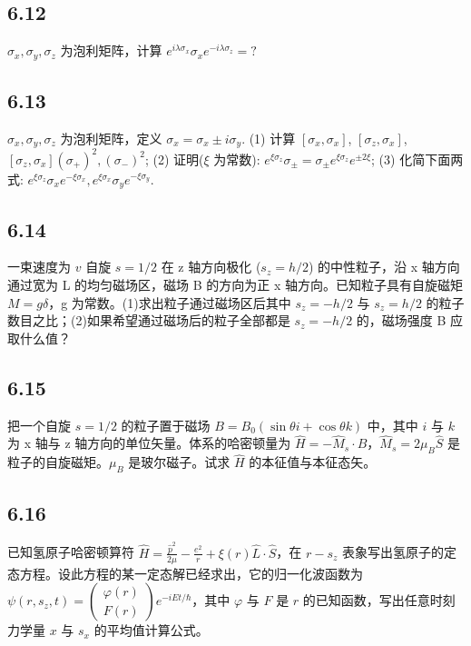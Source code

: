 \subsection{6.12}
$\sigma_x, \sigma_y, \sigma_z$ 为泡利矩阵，计算 $ e^{i\lambda \sigma_x} \sigma_x e^{-i\lambda \sigma_z} = ?$

\subsection{6.13}
$\sigma_x, \sigma_y, \sigma_z$ 为泡利矩阵，定义 $\sigma_x = \sigma_x \pm i\sigma_y$. (1) 计算 $[\sigma_x, \sigma_x]$, $[\sigma_z, \sigma_x]$, $[\sigma_z, \sigma_x](\sigma_+)^2, (\sigma_-)^2$; (2) 证明($\xi$ 为常数): $e^{\xi \sigma_z} \sigma_{\pm} = \sigma_{\pm} e^{\xi \sigma_z} e^{\pm 2 \xi}$; (3) 化简下面两式: $e^{\xi \sigma_z} \sigma_x e^{-\xi \sigma_x}, e^{\xi \sigma_x} \sigma_y e^{-\xi \sigma_y}$.

\subsection{6.14}
一束速度为 $v$ 自旋 $s = 1/2$ 在 z 轴方向极化 ($s_z = h/2$) 的中性粒子，沿 x 轴方向通过宽为 L 的均匀磁场区，磁场 B 的方向为正 x 轴方向。已知粒子具有自旋磁矩 $M = g\delta$，g 为常数。(1)求出粒子通过磁场区后其中 $s_z = -h/2$ 与 $s_z = h/2$ 的粒子数目之比；(2)如果希望通过磁场后的粒子全部都是 $s_z = -h/2$ 的，磁场强度 B 应取什么值？

\subsection{6.15}
把一个自旋 $s = 1/2$ 的粒子置于磁场 $B = B_0 (\sin \theta i + \cos \theta k)$ 中，其中 $i$ 与 $k$ 为 x 轴与 z 轴方向的单位矢量。体系的哈密顿量为 $\hat{H} = -\hat{M}_s \cdot B$，$\hat{M}_s = 2 \mu_B \hat{S}$ 是粒子的自旋磁矩。$\mu_B$ 是玻尔磁子。试求 $\hat{H}$ 的本征值与本征态矢。

\subsection{6.16}
已知氢原子哈密顿算符 $\hat{H} = \frac{\hat{p}^2}{2\mu} - \frac{e^2}{r} + \xi(r) \hat{L} \cdot \hat{S}$，在 $r - s_z$ 表象写出氢原子的定态方程。设此方程的某一定态解已经求出，它的归一化波函数为 $\psi (r, s_z, t) = \begin{pmatrix} \varphi (r) \\ F(r) \end{pmatrix} e^{-iEt/\hbar}$，其中 $\varphi$ 与 $F$ 是 $r$ 的已知函数，写出任意时刻力学量 $x$ 与 $s_x$ 的平均值计算公式。

